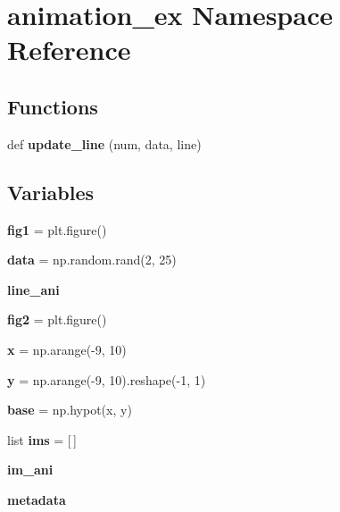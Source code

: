 \hypertarget{namespaceanimation__ex}{}\section{animation\+\_\+ex Namespace Reference}
\label{namespaceanimation__ex}
\subsection*{Functions}
\begin{DoxyCompactItemize}
\item 
\mbox{\label{namespaceanimation__ex_a1bc3cd0fd2deafcc870466428b5cb0d6}} 
def {\bfseries update\+\_\+line} (num, data, line)
\end{DoxyCompactItemize}
\subsection*{Variables}
\begin{DoxyCompactItemize}
\item 
\mbox{\label{namespaceanimation__ex_a02d5ed3cc605cf0681febc2b37bae780}} 
{\bfseries fig1} = plt.\+figure()
\item 
\mbox{\label{namespaceanimation__ex_a7a011d85142c64a3467c3a1f2d196ef9}} 
{\bfseries data} = np.\+random.\+rand(2, 25)
\item 
{\bfseries line\+\_\+ani}
\item 
\mbox{\label{namespaceanimation__ex_a76edff2bd76ff7bcc36dfb40ccb284cf}} 
{\bfseries fig2} = plt.\+figure()
\item 
\mbox{\label{namespaceanimation__ex_a17e317a806a8c4ddea11d6f1ac831201}} 
{\bfseries x} = np.\+arange(-\/9, 10)
\item 
\mbox{\label{namespaceanimation__ex_ae4a2b3f3de462924cd1035084da069e7}} 
{\bfseries y} = np.\+arange(-\/9, 10).reshape(-\/1, 1)
\item 
\mbox{\label{namespaceanimation__ex_a634b973c81c0506526ec7e541414d60c}} 
{\bfseries base} = np.\+hypot(x, y)
\item 
\mbox{\label{namespaceanimation__ex_af37231c6533d6c9e51f943bb5045a3bd}} 
list {\bfseries ims} = \mbox{[}$\,$\mbox{]}
\item 
{\bfseries im\+\_\+ani}
\item 
\mbox{\label{namespaceanimation__ex_a3b7f94a8144cc8d7d9a0a72539056411}} 
{\bfseries metadata}
\end{DoxyCompactItemize}


